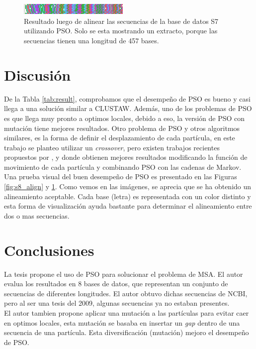 \documentclass[conference]{IEEEtran}
\begin{document}
\begin{figure}[!hbt]
	\centering
	\includegraphics[width=0.47\textwidth]{images/s7_align}
	\caption{Resultado luego de alinear las secuencias de la base de datos S7 utilizando PSO. Solo se esta mostrando un extracto, porque las secuencias tienen una longitud de 457 bases.}
	\label{fig:s7_align}
\end{figure}


\section{Discusión}

De la Tabla \ref{tab:result}, comprobamos que el desempeño de PSO es bueno y casi llega a una solución similar a CLUSTAW. Además, uno de los problemas de PSO es que llega muy pronto a optimos locales, debido a eso, la versión de PSO con mutación tiene mejores resultados. Otro problema  de PSO y otros algoritmos similares, es la forma de definir el desplazamiento de cada partícula, en este trabajo se planteo utilizar un \textit{crossover}, pero existen trabajos recientes propuestos por \cite{zhan2019probpfp}, \cite{lalwani2019multi} y \cite{moustafa2017fragmented} donde obtienen mejores resultados modificando la función de movimiento de cada partícula y combinando PSO con las cadenas de Markov. \\

Una prueba visual del buen desempeño de PSO es presentado en las Figuras \ref{fig:s8_align} y \ref{fig:s7_align}. Como vemos en las imágenes, se aprecia que se ha obtenido un alineamiento aceptable. Cada base (letra) es representada con un color distinto y esta forma de visualización ayuda bastante para determinar el alineamiento entre dos o mas secuencias.

\section{Conclusiones}

La tesis propone el uso de PSO para solucionar el problema de MSA. El autor evalua los resultados en 8 bases de datos, que representan un conjunto de secuencias de diferentes longitudes. El autor obtuvo dichas secuencias de NCBI, pero al ser una tesis del 2009, algunas secuencias ya no estaban presentes.\\

El autor tambien propone aplicar una mutación a las partículas para evitar caer en optimos locales, esta mutación se basaba en insertar un \textit{gap} dentro de una secuencia de una partícula. Esta diversificación (mutación) mejoro el desempeño de PSO. \\
\end{document}
